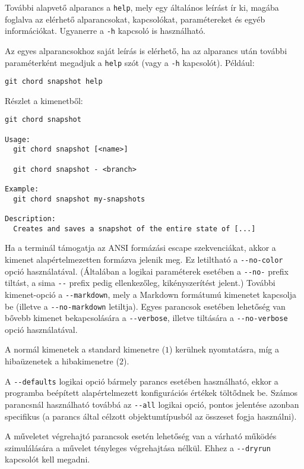 \documentclass[final]{elteikthesis}[2025/03/25]
\begin{document}
További alapvető alparancs a \verb|help|, mely egy általános leírást ír ki,
magába foglalva az elérhető alparancsokat, kapcsolókat, paramétereket és egyéb információkat.
Ugyanerre a \verb|-h| kapcsoló is használható.

Az egyes alparancsokhoz saját leírás is elérhető,
ha az alparancs után további paraméterként megadjuk a \verb|help| szót
(vagy a \verb|-h| kapcsolót).
Például:

\begin{verbatim}
git chord snapshot help
\end{verbatim}

Részlet a kimenetből:

\begin{verbatim}
git chord snapshot

Usage:
  git chord snapshot [<name>]

  git chord snapshot - <branch>

Example:
  git chord snapshot my-snapshots

Description:
  Creates and saves a snapshot of the entire state of [...]
\end{verbatim}

Ha a terminál támogatja az ANSI formázási escape szekvenciákat,
akkor a kimenet alapértelmezetten formázva jelenik meg.
Ez letiltható a \verb|--no-color| opció használatával.
(Általában a logikai paraméterek esetében a \verb|--no-| prefix tiltást,
a sima \verb|--| prefix pedig ellenkezőleg, kikényszerítést jelent.)
További kimenet-opció a \verb|--markdown|, mely a Markdown formátumú kimenetet kapcsolja be (illetve a \verb|--no-markdown| letiltja).
Egyes parancsok esetében lehetőség van bővebb kimenet bekapcsolására a \verb|--verbose|,
illetve tiltására a \verb|--no-verbose| opció használatával.

A normál kimenetek a standard kimenetre ($1$) kerülnek nyomtatásra,
míg a hibaüzenetek a hibakimenetre ($2$).

A \verb|--defaults| logikai opció bármely parancs esetében használható,
ekkor a programba beépített alapértelmezett konfigurációs értékek töltődnek be.
Számos parancsnál használható továbbá az \verb|--all| logikai opció,
pontos jelentése azonban specifikus
(a parancs által célzott objektumtípusból az összeset fogja használni).

A műveletet végrehajtó parancsok esetén lehetőség van a várható működés szimulálására
a művelet tényleges végrehajtása nélkül.
Ehhez a \verb|--dryrun| kapcsolót kell megadni.
\end{document}
